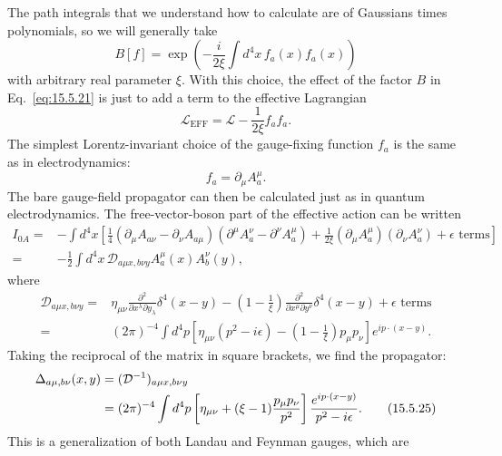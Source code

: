 The path integrals that we understand how to calculate are of Gaussians times
polynomials, so we will generally take
\begin{equation}
  B[f]=\exp\left(-\frac{i}{2\xi}\int d^4x\,f_a(x)f_a(x)\right)
  \tag{15.5.22}\label{eq:15.5.22}
\end{equation}
with arbitrary real parameter $\xi$. With this choice, the effect of the factor
$B$ in Eq.~\eqref{eq:15.5.21} is just to add a term to the effective Lagrangian
\begin{equation}
  \mathcal L_{\mathrm{EFF}}=\mathcal L-\frac{1}{2\xi}f_a f_a.
  \tag{15.5.23}\label{eq:15.5.23}
\end{equation}
The simplest Lorentz-invariant choice of the gauge-fixing function $f_a$
is the same as in electrodynamics:
\begin{equation}
  f_a=\partial_\mu A_a^\mu.
  \tag{15.5.24}\label{eq:15.5.24}
\end{equation}
The bare gauge-field propagator can then be calculated just as in quantum
electrodynamics. The free-vector-boson part of the effective action can be
written
\begin{align*}
  I_{0A}={}&-\int d^4x\left[\frac14
  (\partial_\mu A_{a\nu}-\partial_\nu A_{a\mu})
  (\partial^\mu A_a^\nu-\partial^\nu A_a^\mu)
  +\frac{1}{2\xi}(\partial_\mu A_a^\mu)
  (\partial_\nu A_a^\nu)+\epsilon\text{ terms}\right]
  \\
  ={}&-\frac12\int d^4x\,
  \mathcal D_{a\mu x,b\nu y}A_a^\mu(x)A_b^\nu(y),
\end{align*}
where
\begin{align*}
  \mathcal D_{a\mu x,b\nu y}
  ={}&\eta_{\mu\nu}\frac{\partial^2}{\partial x^\lambda\partial y_\lambda}
  \delta^4(x-y)
  -\left(1-\frac1\xi\right)
  \frac{\partial^2}{\partial x^\mu\partial y^\nu}\delta^4(x-y)
  +\epsilon\text{ terms}
  \\
  ={}&(2\pi)^{-4}\int d^4p\left[\eta_{\mu\nu}(p^2-i\epsilon)
  -\left(1-\frac1\xi\right)p_\mu p_\nu\right]e^{ip\cdot(x-y)}.
\end{align*}
Taking the reciprocal of the matrix in square brackets, we find the propagator:
\begin{align}
  \Delta_{a\mu,b\nu}(x,y)
  &=(\mathcal D^{-1})_{a\mu x,b\nu y}
  \notag\\
  &=(2\pi)^{-4}\int d^4p\left[\eta_{\mu\nu}
  +(\xi-1)\frac{p_\mu p_\nu}{p^2}\right]
 \frac{e^{ip\cdot(x-y)}}{p^2-i\epsilon}.
  \tag{15.5.25}\label{eq:15.5.25}
\end{align}
This is a generalization of both Landau and Feynman gauges, which are
